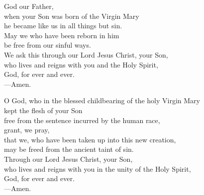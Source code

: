 \prayer

\begin{prayerverse}

God our Father,\\
when your Son was born of the Virgin Mary\\
he became like us in all things but sin.\\
May we who have been reborn in him\\
be free from our sinful ways.\\
We ask this through our Lord Jesus Christ, your Son,\\
who lives and reigns with you and the Holy Spirit,\\
God, for ever and ever.\\
{\color{red}---\thinspace}Amen.

\end{prayerverse}


\begin{prayerverse}

O God, who in the blessed childbearing of the holy Virgin Mary\\
kept the flesh of your Son\\
free from the sentence incurred by the human race,\\
grant, we pray,\\
that we, who have been taken up into this new creation,\\
may be freed from the ancient taint of sin.\\
Through our Lord Jesus Christ, your Son,\\
who lives and reigns with you in the unity of the Holy Spirit,\\
God, for ever and ever.\\
{\color{red}---\thinspace}Amen.

\end{prayerverse}